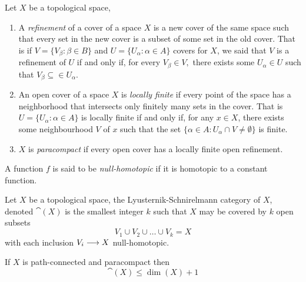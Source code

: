 \begin{defn}
    Let $X$ be a topological space,
    \begin{enumerate}
        \item A \textit{refinement} of a cover of a space $X$ is a new cover of the same space such that every set in the new cover is a subset of some set in the old cover. 
        That is if $V = \{V_\beta : \beta \in B\}$ and $U = \{U_\alpha : \alpha \in A\}$ covers for $X$, we said that $V$ is a refinement of $U$ if and only if, for every $V_\beta \in V,$ there exists some $U_\alpha \in U$ such that $V_\beta \subseteq \in U_\alpha$.
        \item An open cover of a space $X$ is \textit{locally finite} if every point of the space has a neighborhood that intersects only finitely many sets in the cover. 
        That is $U = \{U_\alpha : \alpha \in A\}$ is locally finite if and only if, for any $x \in X$, there exists some neighbourhood $V$ of $x$ such that the set $\{\alpha \in A : U_\alpha \cap V \neq \emptyset\}$ is finite.
        \item $X$ is \textit{paracompact} if every open cover has a locally finite open refinement.
    \end{enumerate}
\end{defn}

\begin{defn}
    A function $f$ is said to be \textit{null-homotopic} if it is homotopic to a constant function.
\end{defn}

\begin{defn}
    Let $X$ be a topological space, the Lyusternik-Schnirelmann category of $X$, denoted $\cat(X)$ is the smallest integer $k$ such that $X$ may be covered by $k$ open subsets
    \[
        V_1 \cup V_2 \cup \ldots \cup V_k = X
    \]
    with each inclusion $V_i \longrightarrow X$ null-homotopic.
\end{defn}

\begin{prop}\cite{james1978category}\label{james:1}
    If $X$ is path-connected and paracompact then
    \[
        \cat(X) \le \dim(X) + 1
    \]
\end{prop}

